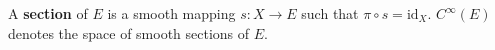 A \textbf{section} of $E$ is a smooth mapping $s: X \rightarrow E$ such that $\pi \circ s = \mathrm{id}_X$. $C^\infty(E)$ denotes the space of smooth sections of $E$.
